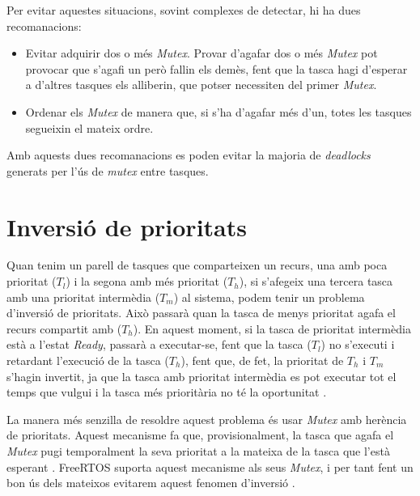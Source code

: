 Per evitar aquestes situacions, sovint complexes de detectar, hi ha dues recomanacions:
\begin{itemize}
 \item Evitar adquirir dos o més {\em Mutex}. Provar d'agafar dos o més {\em Mutex} pot provocar que s'agafi un però fallin els demès, fent que la tasca hagi d'esperar a d'altres tasques els alliberin, que potser necessiten del primer {\em Mutex}.
 \item Ordenar els {\em Mutex} de manera que, si s'ha d'agafar més d'un, totes les tasques segueixin el mateix ordre.
\end{itemize}

Amb aquests dues recomanacions es poden evitar la majoria de {\em deadlocks} generats per l'ús de {\em mutex} entre tasques.

\section{Inversió de prioritats}
\label{sec:priorityinv}
Quan tenim un parell de tasques que comparteixen un recurs, una amb poca prioritat ($T_l$) i la segona amb més prioritat ($T_h$), si s'afegeix una tercera tasca amb una prioritat intermèdia ($T_m$) al sistema, podem tenir un problema d'inversió de prioritats. Això passarà quan la tasca de menys prioritat agafa el recurs compartit amb ($T_h$). En aquest moment, si la tasca de prioritat intermèdia està a l'estat {\em Ready}, passarà a executar-se, fent que la tasca ($T_l$) no s'executi i retardant l'execució de la tasca ($T_h$), fent que, de fet, la prioritat de $T_h$ i $T_m$ s'hagin invertit, ja que la tasca amb prioritat intermèdia es pot executar tot el temps que vulgui i la tasca més prioritària no té la oportunitat \cite[101]{RTEmbeddedSystems}.

La manera més senzilla de resoldre aquest problema és usar {\em Mutex} amb herència de prioritats. Aquest mecanisme fa que, provisionalment, la tasca que agafa el {\em Mutex} pugi temporalment la seva prioritat a la mateixa de la tasca que l'està esperant \cite[106]{RTEmbeddedSystems}. FreeRTOS suporta aquest mecanisme als seus {\em Mutex}, i per tant fent un bon ús dels mateixos evitarem aquest fenomen d'inversió \cite[251]{FreeRTOSBook}.

